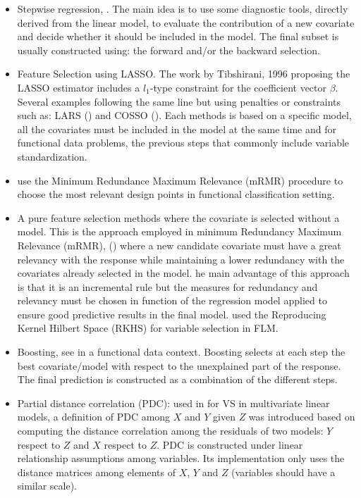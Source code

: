 \documentclass[
]{book}
\begin{document}
\begin{itemize}
\item
  Stepwise regression, \citet{Akaike1973}. The main idea is to use some diagnostic tools, directly derived from the linear model, to evaluate the contribution of a new covariate and decide whether it should be included in the model. The final subset is usually constructed using: the forward and/or the backward selection.
\item
  Feature Selection using LASSO. The work by Tibshirani, 1996 proposing the LASSO estimator includes a \(l_1\)-type constraint for the coefficient vector \(\beta\). Several examples following the same line but using penalties or constraints such as: LARS (\citet{efron2004least}) and COSSO (\citet{lin2006component}). Each methods is based on a specific model, all the covariates must be included in the model at the same time and for functional data problems, the previous steps that commonly include variable standardization.
\item
  \citet{berrendero2016variable} use the Minimum Redundance Maximum Relevance (mRMR) procedure to choose the most relevant design points in functional classification setting.
\item
  A pure feature selection methods where the covariate is selected without a model. This is the approach employed in minimum Redundancy Maximum Relevance (mRMR), (\citet{peng2005feature}) where a new candidate covariate must have a great relevancy with the response while maintaining a lower redundancy with the covariates already selected in the model. he main advantage of this approach is that it is an incremental rule but the measures for redundancy and relevancy must be chosen in function of the regression model applied to ensure good predictive results in the final model. \citet{berrendero2018} used the Reproducing Kernel Hilbert Space (RKHS) for variable selection in FLM.
\item
  Boosting, see \citet{Ferraty2009} in a functional data context. Boosting selects at each step the best covariate/model with respect to the unexplained part of the response. The final prediction is constructed as a combination of the different steps.
\item
  Partial distance correlation (PDC): used in \citet{Yenigun2015} for VS in multivariate linear models, a definition of PDC among \(X\) and \(Y\) given \(Z\) was introduced based on computing the distance correlation among the residuals of two models: \(Y\) respect to \(Z\) and \(X\) respect to \(Z\). PDC is constructed under linear relationship assumptions among variables. Its implementation only uses the distance matrices among elements of \(X\), \(Y\) and \(Z\) (variables should have a similar scale).
\end{itemize}
\end{document}
